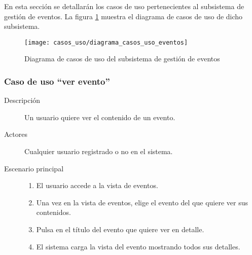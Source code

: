 En esta sección se detallarán los casos de uso pertenecientes al subsistema de gestión de eventos. La figura \ref{fig:casos_uso_subsistema_eventos} muestra el diagrama de casos de uso de dicho subsistema.

\begin{figure}[h]
\centering
\texttt{[image: casos\_uso/diagrama\_casos\_uso\_eventos]}
\caption{Diagrama de casos de uso del subsistema de gestión de eventos}
\label{fig:casos_uso_subsistema_eventos}
\end{figure}


\subsubsection{Caso de uso ``ver evento''}
\begin{description}
\item[Descripción] Un usuario quiere ver el contenido de un evento.
\item[Actores] Cualquier usuario registrado o no en el sistema.
\item[Escenario principal] 	\hfill
							\begin{enumerate}
							\item El usuario accede a la vista de eventos.
							\item Una vez en la vista de eventos, elige el evento del que quiere ver sus contenidos.
							\item Pulsa en el título del evento que quiere ver en detalle.
							\item El sistema carga la vista del evento mostrando todos sus detalles.
							\end{enumerate}
\end{description}


